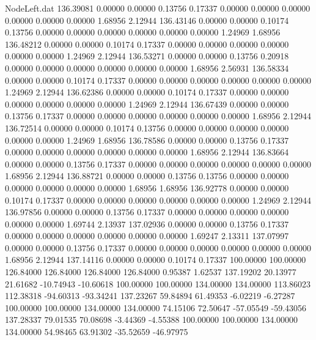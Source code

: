 \begin{filecontents}{NodeLeft.dat}
 136.39081    0.00000    0.00000     0.13756    0.17337    0.00000    0.00000    0.00000    0.00000    0.00000    0.00000    1.68956    2.12944
 136.43146    0.00000    0.00000     0.10174    0.13756    0.00000    0.00000    0.00000    0.00000    0.00000    0.00000    1.24969    1.68956
 136.48212    0.00000    0.00000     0.10174    0.17337    0.00000    0.00000    0.00000    0.00000    0.00000    0.00000    1.24969    2.12944
 136.53271    0.00000    0.00000     0.13756    0.20918    0.00000    0.00000    0.00000    0.00000    0.00000    0.00000    1.68956    2.56931
 136.58334    0.00000    0.00000     0.10174    0.17337    0.00000    0.00000    0.00000    0.00000    0.00000    0.00000    1.24969    2.12944
 136.62386    0.00000    0.00000     0.10174    0.17337    0.00000    0.00000    0.00000    0.00000    0.00000    0.00000    1.24969    2.12944
 136.67439    0.00000    0.00000     0.13756    0.17337    0.00000    0.00000    0.00000    0.00000    0.00000    0.00000    1.68956    2.12944
 136.72514    0.00000    0.00000     0.10174    0.13756    0.00000    0.00000    0.00000    0.00000    0.00000    0.00000    1.24969    1.68956
 136.78586    0.00000    0.00000     0.13756    0.17337    0.00000    0.00000    0.00000    0.00000    0.00000    0.00000    1.68956    2.12944
 136.83664    0.00000    0.00000     0.13756    0.17337    0.00000    0.00000    0.00000    0.00000    0.00000    0.00000    1.68956    2.12944
 136.88721    0.00000    0.00000     0.13756    0.13756    0.00000    0.00000    0.00000    0.00000    0.00000    0.00000    1.68956    1.68956
 136.92778    0.00000    0.00000     0.10174    0.17337    0.00000    0.00000    0.00000    0.00000    0.00000    0.00000    1.24969    2.12944
 136.97856    0.00000    0.00000     0.13756    0.17337    0.00000    0.00000    0.00000    0.00000    0.00000    0.00000    1.69744    2.13937
 137.02936    0.00000    0.00000     0.13756    0.17337    0.00000    0.00000    0.00000    0.00000    0.00000    0.00000    1.69247    2.13311
 137.07997    0.00000    0.00000     0.13756    0.17337    0.00000    0.00000    0.00000    0.00000    0.00000    0.00000    1.68956    2.12944
 137.14116    0.00000    0.00000     0.10174    0.17337  100.00000  100.00000  126.84000  126.84000  126.84000  126.84000    0.95387    1.62537
 137.19202   20.13977   21.61682   -10.74943  -10.60618  100.00000  100.00000  134.00000  134.00000  113.86023  112.38318  -94.60313  -93.34241
 137.23267   59.84894   61.49353    -6.02219   -6.27287  100.00000  100.00000  134.00000  134.00000   74.15106   72.50647  -57.05549  -59.43056
 137.28337   79.01535   70.08698    -3.44369   -4.55388  100.00000  100.00000  134.00000  134.00000   54.98465   63.91302  -35.52659  -46.97975

\end{filecontents}

